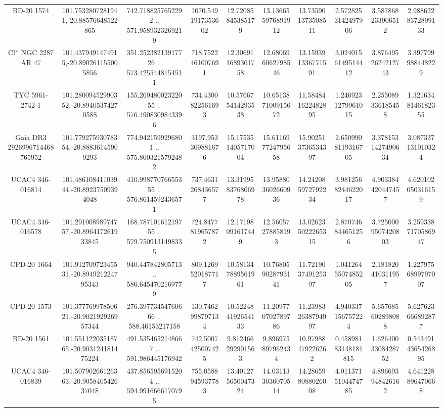 \begin{table}
\begin{tabular}{cccccccccc}
BD-20  1574 & 101.7532807281941,-20.88576648522865 & 742.7188257652292 .. 571.9589323269219 & 1070.5491917353602 & 12.72085845385179 & 13.136655976891912 & 13.735901373508511 & 2.5728253142497906 & 3.587868233906512 & 2.9886228372899133 \\
Cl* NGC 2287     AR      47 & 101.4379491474915,-20.890261155005856 & 351.25238213917726 .. 573.4255448154511 & 718.7522461007691 & 12.306911689301758 & 12.680696062798546 & 13.159391336771591 & 3.0240156149514412 & 3.8764952624212743 & 3.397799988448229 \\
TYC 5961-2742-1 & 101.28009452990352,-20.89405374270588 & 155.26948002322055 .. 576.4908309843396 & 734.4300822561693 & 10.576675414293538 & 10.651387100915672 & 11.584841622482895 & 1.2469231279961015 & 2.255089336185458 & 1.3216348146182355 \\
Gaia DR3 2926996714468765952 & 101.77927593078354,-20.88836145909293 & 774.9421599296801 .. 575.8003215792482 & 3197.953309881676 & 15.175351405717004 & 15.611697724795658 & 15.902513736534397 & 2.6509908119316705 & 3.3781531427490634 & 3.087337131010324 \\
UCAC4 346-016814 & 101.48610841103944,-20.89237509394048 & 410.99877076655355 .. 576.8614592436571 & 737.4631268436577 & 13.319958376806978 & 13.958803602660936 & 14.242085972792234 & 3.9812568244622017 & 4.903384420447457 & 4.620102050316159 \\
UCAC4 346-016578 & 101.29100898974757,-20.896417261933845 & 168.78710161219755 .. 579.7509131498335 & 724.8477819657872 & 12.17198091617449 & 12.56057278858193 & 13.026235022265315 & 2.870746844651256 & 3.7250009507420803 & 3.2593387170586947 \\
CPD-20  1664 & 101.91270972345531,-20.894921224795343 & 940.447842805713 .. 586.6454702169779 & 809.1269520187717 & 10.581347889561961 & 10.768059028793141 & 11.721903749125397 & 1.0412645507485205 & 2.181820410311957 & 1.2279756899797007 \\
CPD-20  1573 & 101.37776997850621,-20.902192926957344 & 276.39773454760666 .. 588.46153217158 & 130.7462998797134 & 10.522484192654133 & 11.209770702789786 & 11.239832638794997 & 4.940337156757224 & 5.657685602898088 & 5.627623666892877 \\
BD-20  1561 & 101.55112203518765,-20.903124181475224 & 491.5354652148667 .. 591.986445176942 & 742.5007425007425 & 9.812466292901563 & 9.896975897962434 & 10.97988479226262 & 0.45898183148181815 & 1.6264003308428752 & 0.5434914365426895 \\
UCAC4 346-016839 & 101.50790266126363,-20.905840542637048 & 437.8565956915204 .. 594.9916666170795 & 755.0588945937783 & 13.401275650047324 & 14.031133036070514 & 14.286598088026008 & 4.0113715104474785 & 4.896693948426162 & 4.641228896470668 \\

\end{tabular}
\end{table}
